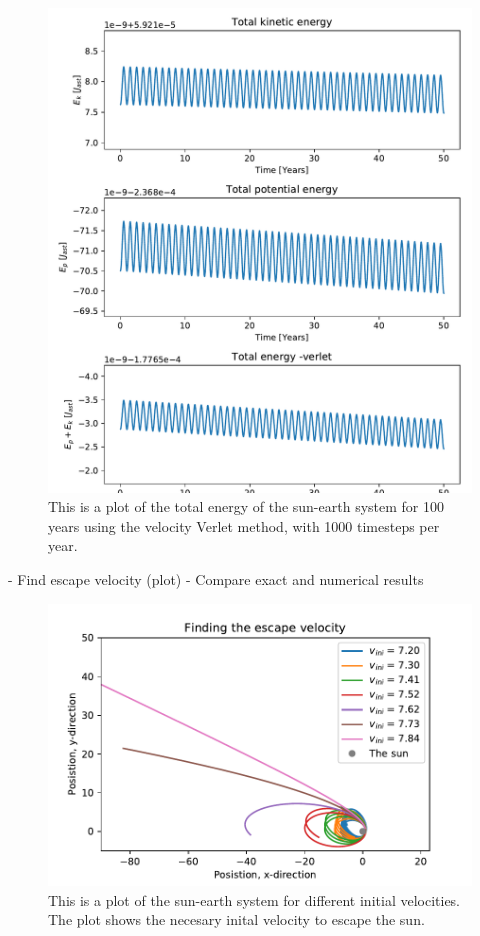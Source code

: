 \begin{figure}[H]
\includegraphics[width=1.1\linewidth]{../results/plots/totalenergy-verlet.pdf}\caption{This is a plot of the total energy of the sun-earth system for 100 years using the velocity Verlet method, with 1000 timesteps per year.}\label{fig:totalenergy-verlet}
\end{figure}

	- Find escape velocity (plot)
	 	- Compare exact and numerical results
	 	
\begin{figure}[H]
\includegraphics[width=1.1\linewidth]{../results/plots/escape_velocity.pdf}\caption{This is a plot of the sun-earth system for different initial velocities. The plot shows the necesary inital velocity to escape the sun.}\label{fig:escape_velocity}
\end{figure}

